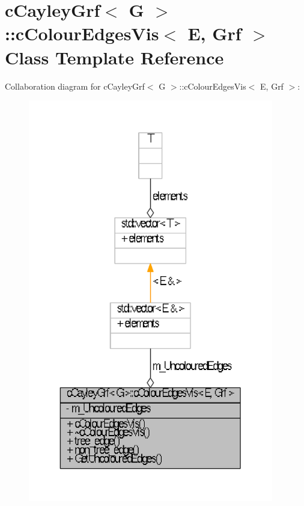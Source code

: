 \hypertarget{classcCayleyGrf_1_1cColourEdgesVis}{\section{c\-Cayley\-Grf$<$ \-G $>$\-:\-:c\-Colour\-Edges\-Vis$<$ \-E, \-Grf $>$ \-Class \-Template \-Reference}
\label{classcCayleyGrf_1_1cColourEdgesVis}
}


\-Collaboration diagram for c\-Cayley\-Grf$<$ \-G $>$\-:\-:c\-Colour\-Edges\-Vis$<$ \-E, \-Grf $>$\-:\nopagebreak
\begin{figure}[H]
\begin{center}
\leavevmode
\includegraphics[width=304pt]{classcCayleyGrf_1_1cColourEdgesVis__coll__graph}
\end{center}
\end{figure}
